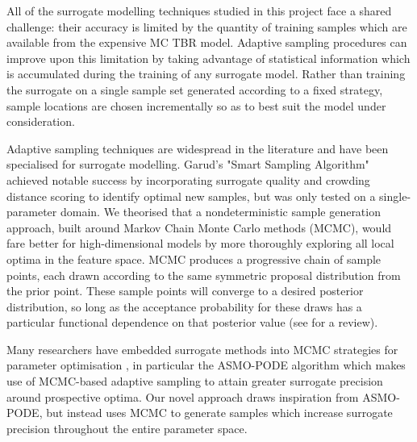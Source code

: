 All of the surrogate modelling techniques studied in this project face a shared
challenge: their accuracy is limited by the quantity of training samples which
are available from the expensive MC TBR model. Adaptive sampling procedures can
improve upon this limitation by taking advantage of statistical information
which is accumulated during the training of any surrogate model. Rather than
training the surrogate on a single sample set generated according to a fixed
strategy, sample locations are chosen incrementally so as to best suit the model
under consideration.

Adaptive sampling techniques are widespread in the literature and have been
specialised for surrogate modelling. Garud's \cite{Garud2016} "Smart Sampling
Algorithm" achieved notable success by incorporating surrogate quality and
crowding distance scoring to identify optimal new samples, but was only tested
on a single-parameter domain. We theorised that a nondeterministic sample
generation approach, built around Markov Chain Monte Carlo methods (MCMC), would
fare better for high-dimensional models by more thoroughly exploring all local
optima in the feature space. MCMC produces a progressive chain of sample points,
each drawn according to the same symmetric proposal distribution
from the prior point. These sample points will converge to a desired posterior
distribution, so long as the acceptance probability for these draws has a
particular functional dependence on that posterior value (see \cite{Zhou2018}
for a review).


Many researchers have embedded surrogate methods into MCMC strategies for
parameter optimisation \cite{Zhang2020,Gong2017}, in particular the ASMO-PODE
algorithm \cite{Ginting2011} which makes use of MCMC-based adaptive sampling to
attain greater surrogate precision around prospective optima. Our novel approach
draws inspiration from ASMO-PODE, but instead uses MCMC to generate samples
which increase surrogate precision throughout the entire parameter space.

